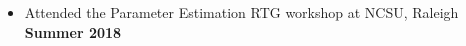 \begin{itemize}
\item Attended the Parameter Estimation RTG workshop at NCSU, Raleigh \textbf{Summer 2018}
\end{itemize}






